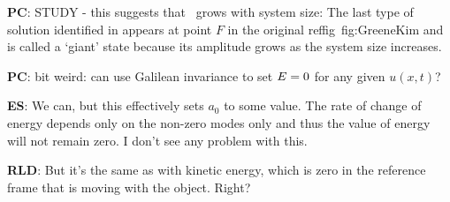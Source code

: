 {%

{\bf PC}: STUDY - this suggests that \expctE\ grows with system size:
   The last type of solution identified in 
   appears at point $F$  in the original reffig~{fig:GreeneKim}
   and is called a
   `giant' state because its amplitude grows as the system size
   increases.



{\bf PC}: bit weird: can use Galilean invariance to
    set $E=0$ for any given $u(x,t)$?


{\bf ES}:  We can, but this effectively
sets $a_0$ to some value. The rate of change of energy depends only on the
non-zero modes only and thus the value of energy will not remain zero. I don't
see any problem with this.
}

{\bf RLD}: But it's the same as with kinetic energy, which is zero
in the reference frame that is moving with the object. Right?



